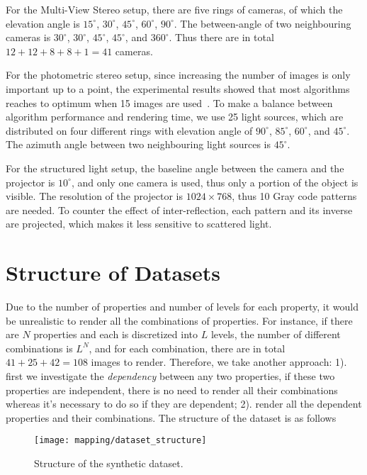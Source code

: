 For the Multi-View Stereo setup, there are five rings of cameras, of which the elevation angle is $15^\circ$, $30^\circ$, $45^\circ$, $60^\circ$, $90^\circ$. The between-angle of two neighbouring cameras is $30^\circ$, $30^\circ$, $45^\circ$, $45^\circ$, and $360^\circ$. Thus there are in total $12+12+8+8+1=41$ cameras.

For the photometric stereo setup, since increasing the number of images is only important up to a point, the experimental results showed that most algorithms reaches to optimum when 15 images are used~\cite{Berkiten:2016:ARB}. To make a balance between algorithm performance and rendering time, we use 25 light sources, which are distributed on four different rings with elevation angle of $90^\circ$, $85^\circ$, $60^\circ$, and $45^\circ$. The azimuth angle between two neighbouring light sources is $45^\circ$.

For the structured light setup, the baseline angle between the camera and the projector is $10^\circ$, and only one camera is used, thus only a portion of the object is visible. The resolution of the projector is $1024\times768$, thus 10 Gray code patterns are needed. To counter the effect of inter-reflection, each pattern and its inverse are projected, which makes it less sensitive to scattered light.

\section{Structure of Datasets}
Due to the number of properties and number of levels for each property, it would be unrealistic to render all the combinations of properties. For instance, if there are $N$ properties and each is discretized into $L$ levels, the number of different combinations is $L^N$, and for each combination, there are in total $41+25+42=108$ images to render. Therefore, we take another approach: 1). first we investigate the \textit{dependency} between any two properties, if these two properties are independent, there is no need to render all their combinations whereas it's necessary to do so if they are dependent; 2). render all the dependent properties and their combinations. The structure of the dataset is as follows
\begin{figure}[!htbp]
\centering
\texttt{[image: mapping/dataset\_structure]}
\caption{Structure of the synthetic dataset.}
\label{fig:dataset_structure}
\end{figure}

